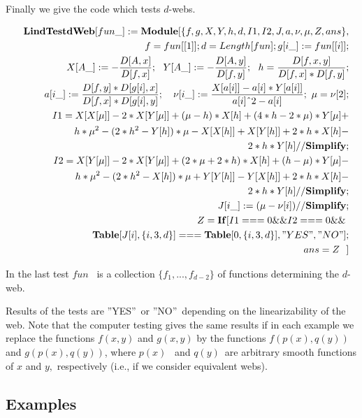 \documentclass{article}
\begin{document}
Finally we give the code which tests $d$-webs.

\begin{eqnarray*}
&&\mathbf{LindTestdWeb}[fun\_]:=\mathbf{Module}[\{f,g,X,Y,h,d,I1,I2,J,a,\nu
,\mu ,Z,ans\}, \\
&&\ f=fun[[1]];d=Length[fun];g[i\_]:=fun[[i]]; \\
&&X[A\_]:=-\frac{D[A,x]}{D[f,x]};\ \ Y[A\_]:=-\frac{D[A,y]}{D[f,y]};\ \ h=%
\frac{D[f,x,y]}{D[f,x]\ast D[f,y]}; \\
&&\ a[i\_]:=\frac{D[f,y]\ast D[g[i],x]}{D[f,x]\ast D[g[i],y]};\ \ \ \nu
\lbrack i\_]:=\frac{X[a[i]]-a[i]\ast Y[a[i]]}{a[i]\symbol{94}2-a[i]};\ \mu
=\nu \lbrack 2]; \\
&&I1=X[X[\mu ]]-2\ast X[Y[\mu ]]+(\mu -h)\ast X[h]+(4\ast h-2\ast \mu )\ast
Y[\mu ]+ \\
&&h\ast \mu ^{2}-(2\ast h^{2}-Y[h])\ast \mu -X[X[h]]+X[Y[h]]+2\ast h\ast
X[h]- \\
&&2\ast h\ast Y[h]//\mathbf{Simplify;} \\
&&I2=X[Y[\mu ]]-2\ast X[Y[\mu ]]+(2\ast \mu +2\ast h)\ast X[h]+(h-\mu )\ast
Y[\mu ]- \\
&&h\ast \mu ^{2}-(2\ast h^{2}-X[h])\ast \mu +Y[Y[h]]-Y[X[h]]+2\ast h\ast
X[h]- \\
&&2\ast h\ast Y[h]//\mathbf{Simplify;} \\
&&J[i\_]:=(\mu -\nu \lbrack i])//\mathbf{Simplify;} \\
&&Z=\mathbf{If}[I1===0\&\&I2===0\&\&\  \\
&&\mathbf{Table[}J[i],\{i,3,d\}]===\mathbf{Table[}0,\{i,3,d\}],"YES","NO"];
\\
&&ans=Z\ \ ]
\end{eqnarray*}

In the last test $fun$ \ is a collection $\{f_{1},...,f_{d-2}\}$ of
functions determining the $d$-web.

Results of the tests are ''YES''\ or ''NO''\ depending on the
linearizability of the web. Note that the computer testing gives the same
results if in each example we replace the functions $f(x,y)$ and $g(x,y)$ by
the functions $f(p(x),q(y))$ and $g(p(x),q(y))$, where $p(x)$ \ and $q(y)$\
are arbitrary smooth functions of $x$ and $y,$ respectively (i.e., if we
consider equivalent webs).

\subsection{Examples}
\end{document}
